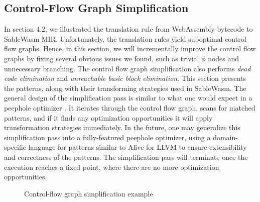 \subsection{Control-Flow Graph Simplification}

In section 4.2, we illustrated the translation rule from WebAssembly bytecode to
SableWasm MIR. Unfortunately, the translation rules yield suboptimal control
flow graphs. Hence, in this section, we will incrementally improve the control
flow graphs by fixing several obvious issues we found, such as trivial $\phi$
nodes and unnecessary branching. The control flow graph simplification also
performs \emph{dead code elimination} and \emph{unreachable basic block
    elimination}. This section presents the patterns, along with their
transforming strategies used in SableWasm. The general design of the
simplification pass is similar to what one would expect in a peephole optimizer
\cite{peephole-opt}. It iterates through the control flow graph, scans for
matched patterns, and if it finds any optimization opportunities it will apply
transformation strategies immediately. In the future, one may generalize this
simplification pass into a fully-featured peephole optimizer, using a
domain-specific language for patterns similar to Alive
\cite{alive, alive-in-lean} for LLVM to ensure extensibility and correctness of
the patterns. The simplification pass will terminate once the execution reaches
a fixed point, where there are no more optimization opportunities.

\begin{figure}
    \begin{minipage}[t]{.5\textwidth}
        
    \end{minipage}\hfill
    \begin{minipage}[t]{.5\textwidth}
        
    \end{minipage}
    \caption{Control-flow graph simplification example}
    \label{fig:simplify-example}
\end{figure}

